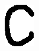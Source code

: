 \documentclass[russian,utf8,emptystyle]{eskdtext}
\begin{document}
\begin{figure}[!htb]
\includegraphics[width=\linewidth]{../data/learn/c/001}
\endminipage\hfill
{}

\end{figure}
\end{document}
